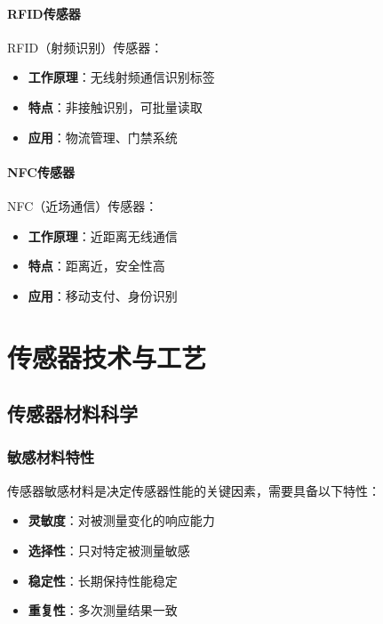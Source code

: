 \documentclass[12pt,UTF8]{ctexbook}
\begin{document}
\subsection{RFID传感器}

RFID（射频识别）传感器：

\begin{itemize}[leftmargin=2cm]
	\item \textbf{工作原理}：无线射频通信识别标签
	\item \textbf{特点}：非接触识别，可批量读取
	\item \textbf{应用}：物流管理、门禁系统
\end{itemize}

\subsection{NFC传感器}

NFC（近场通信）传感器：

\begin{itemize}[leftmargin=2cm]
	\item \textbf{工作原理}：近距离无线通信
	\item \textbf{特点}：距离近，安全性高
	\item \textbf{应用}：移动支付、身份识别
\end{itemize}

\part{传感器技术与工艺}

\chapter{传感器材料科学}

\section{敏感材料特性}

传感器敏感材料是决定传感器性能的关键因素，需要具备以下特性：

\begin{itemize}[leftmargin=2cm]
	\item \textbf{灵敏度}：对被测量变化的响应能力
	\item \textbf{选择性}：只对特定被测量敏感
	\item \textbf{稳定性}：长期保持性能稳定
	\item \textbf{重复性}：多次测量结果一致
\end{itemize}
\end{document}
